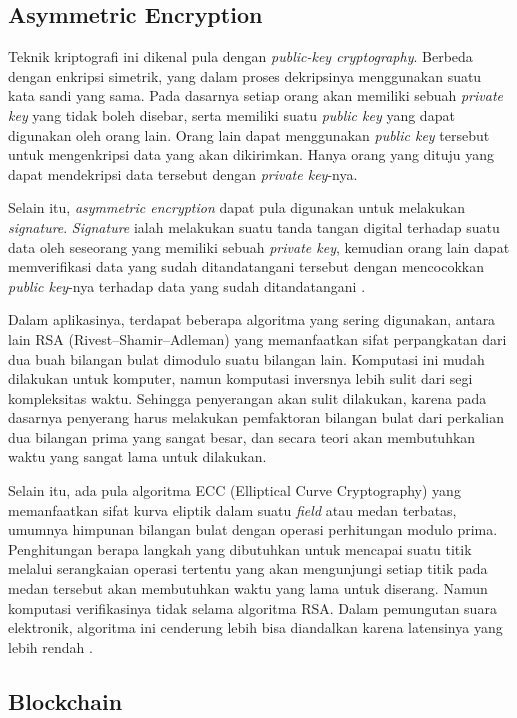 \subsection{Asymmetric Encryption}

Teknik kriptografi ini dikenal pula dengan \textit{public-key cryptography}. Berbeda dengan enkripsi simetrik, yang dalam proses dekripsinya menggunakan suatu kata sandi yang sama. Pada dasarnya setiap orang akan memiliki sebuah \textit{private key} yang tidak boleh disebar, serta memiliki suatu \textit{public key} yang dapat digunakan oleh orang lain. Orang lain dapat menggunakan \textit{public key} tersebut untuk mengenkripsi data yang akan dikirimkan. Hanya orang yang dituju yang dapat mendekripsi data tersebut dengan \textit{private key}-nya.

Selain itu, \textit{asymmetric encryption} dapat pula digunakan untuk melakukan \textit{signature}. \textit{Signature} ialah melakukan suatu tanda tangan digital terhadap suatu data oleh seseorang yang memiliki sebuah \textit{private key}, kemudian orang lain dapat memverifikasi data yang sudah ditandatangani tersebut dengan mencocokkan \textit{public key}-nya terhadap data yang sudah ditandatangani \citep{pubkey}.

Dalam aplikasinya, terdapat beberapa algoritma yang sering digunakan, antara lain RSA (Rivest–Shamir–Adleman) yang memanfaatkan sifat perpangkatan dari dua buah bilangan bulat dimodulo suatu bilangan lain. Komputasi ini mudah dilakukan untuk komputer, namun komputasi inversnya lebih sulit dari segi kompleksitas waktu. Sehingga penyerangan akan sulit dilakukan, karena pada dasarnya penyerang harus melakukan pemfaktoran bilangan bulat dari perkalian dua bilangan prima yang sangat besar, dan secara teori akan membutuhkan waktu yang sangat lama untuk dilakukan.

Selain itu, ada pula algoritma ECC (Elliptical Curve Cryptography) yang memanfaatkan sifat kurva eliptik dalam suatu \textit{field} atau medan terbatas, umumnya himpunan bilangan bulat dengan operasi perhitungan modulo prima. Penghitungan berapa langkah yang dibutuhkan untuk mencapai suatu titik melalui serangkaian operasi tertentu yang akan mengunjungi setiap titik pada medan tersebut akan membutuhkan waktu yang lama untuk diserang. Namun komputasi verifikasinya tidak selama algoritma RSA. Dalam pemungutan suara elektronik, algoritma ini cenderung lebih bisa diandalkan karena latensinya yang lebih rendah \citep{mahto2017rsa}.

\subsection{Blockchain}

